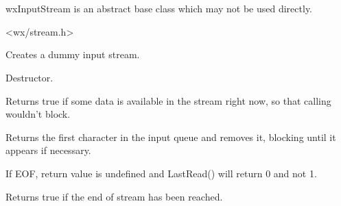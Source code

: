 \section{}\label{wxinputstream}

wxInputStream is an abstract base class which may not be used directly.




<wx/stream.h>


\label{wxinputstreamctor}


Creates a dummy input stream.

\label{wxinputstreamdtor}


Destructor.

\label{wxinputstreamcanread}


Returns true if some data is available in the stream right now, so that
calling  wouldn't block.

\label{wxinputstreamgetc}


Returns the first character in the input queue and removes it, 
blocking until it appears if necessary.


If EOF, return value is undefined and LastRead() will return 0 and not 1.

\label{wxinputstreameof}


Returns true if the end of stream has been reached.


